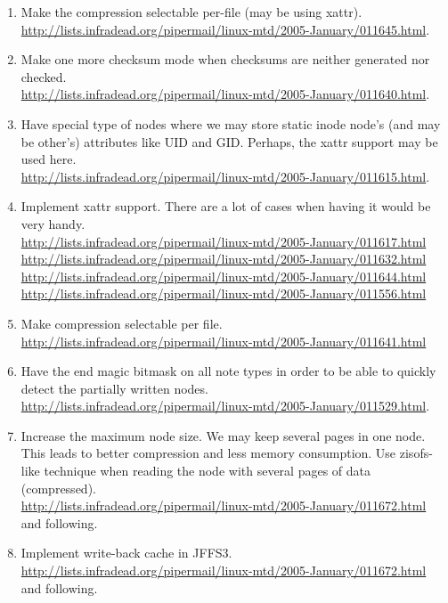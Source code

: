 \documentclass[12pt,a4paper,oneside,titlepage]{article}
\begin{document}
\begin{enumerate}
\item Make the compression selectable per-file (may be using xattr).\\
\url{http://lists.infradead.org/pipermail/linux-mtd/2005-January/011645.html}.

\item Make one more checksum mode when checksums are neither
generated nor checked.\\
\url{http://lists.infradead.org/pipermail/linux-mtd/2005-January/011640.html}.

\item Have special type of nodes where we may store static inode node's
(and may be other's) attributes like UID and GID. Perhaps, the xattr
support may be used here.\\
\url{http://lists.infradead.org/pipermail/linux-mtd/2005-January/011615.html}.

\item Implement xattr support. There are a lot of cases when having it
would be very handy.\\
\url{http://lists.infradead.org/pipermail/linux-mtd/2005-January/011617.html}\\
\url{http://lists.infradead.org/pipermail/linux-mtd/2005-January/011632.html}\\
\url{http://lists.infradead.org/pipermail/linux-mtd/2005-January/011644.html}\\
\url{http://lists.infradead.org/pipermail/linux-mtd/2005-January/011556.html}

\item Make compression selectable per file.\\
\url{http://lists.infradead.org/pipermail/linux-mtd/2005-January/011641.html}

\item Have the end magic bitmask on all note types in order to be able
to quickly detect the partially written nodes.\\
\url{http://lists.infradead.org/pipermail/linux-mtd/2005-January/011529.html}.

\item Increase the maximum node size. We may keep several pages in one node.
This leads to better compression and less memory consumption. Use
zisofs-like technique when reading the node with several pages of data
(compressed).\\
\url{http://lists.infradead.org/pipermail/linux-mtd/2005-January/011672.html}\\
and following.

\item Implement write-back cache in JFFS3.\\
\url{http://lists.infradead.org/pipermail/linux-mtd/2005-January/011672.html}\\
and following.
\end{enumerate}
\end{document}
